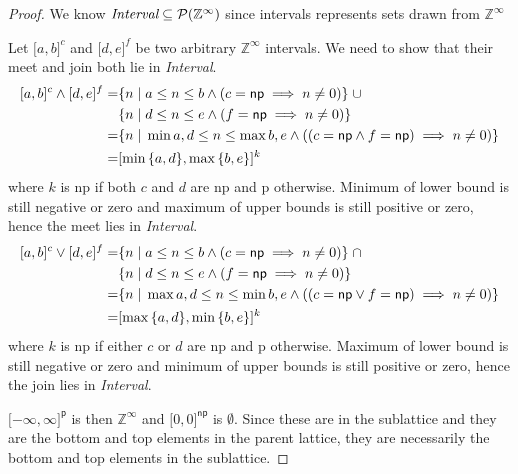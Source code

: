 \documentclass{article}
\theoremstyle{definition}
\theoremstyle{plain}
\newcommand{\zinf}{\textnormal{$\mathbb{Z}^\infty$}}
\newcommand{\interv}[3]{\textnormal{$\lbrack#1,#2\rbrack^{#3}$}}
\begin{document}
\begin{proof}
  We know $\textit{Interval} \subseteq \mathcal{P}(\zinf{})$ since intervals
  represents sets drawn from {\zinf{}}

  Let \interv{a}{b}{c} and \interv{d}{e}{f} be two arbitrary \zinf{} intervals.
  We need to show that their meet and join both lie in \textit{Interval}.
%
  \begin{align*}
    \interv{a}{b}{c} \wedge \interv{d}{e}{f} = &
      \{ n \;|\; a \leq n \leq b \wedge (c = \textsf{np} \implies n \neq 0) \}
      \;\cup \\
      & \{ n \;|\; d \leq n \leq e \wedge (f = \textsf{np} \implies n \neq 0) \}
      \\
    = & \{ n \;|\; \min{a,d} \leq n \leq \max{b,e} \wedge ((c =
      \textsf{np} \wedge f = \textsf{np}) \implies n \neq 0) \} \\
    = & \interv{\min{\{a,d\}}}{\max{\{b,e\}}}{k}
  \end{align*}
%
  where $k$ is \textsf{np} if both $c$ and $d$ are \textsf{np} and \textsf{p}
  otherwise. Minimum of lower bound is still negative or zero and maximum of
  upper bounds is still positive or zero, hence the meet lies in
  \textit{Interval}.
%
  \begin{align*}
    \interv{a}{b}{c} \vee \interv{d}{e}{f} = &
      \{ n \;|\; a \leq n \leq b \wedge (c = \textsf{np} \implies n \neq 0) \}
      \;\cap \\
      & \{ n \;|\; d \leq n \leq e \wedge (f = \textsf{np} \implies n \neq 0) \}
      \\
    = & \{ n \;|\; \max{a,d} \leq n \leq \min{b,e} \wedge ((c =
      \textsf{np} \vee f = \textsf{np}) \implies n \neq 0) \} \\
    = & \interv{\max{\{a,d\}}}{\min{\{b,e\}}}{k}
  \end{align*}
%
  where $k$ is \textsf{np} if either $c$ or $d$ are \textsf{np} and \textsf{p}
  otherwise. Maximum of lower bound is still negative or zero and minimum of
  upper bounds is still positive or zero, hence the join lies in
  \textit{Interval}.

  \interv{-\infty}{\infty}{\textsf{p}} is then \zinf{} and
  \interv{0}{0}{\textsf{np}} is $\emptyset$. Since these are in the sublattice
  and they are the bottom and top elements in the parent lattice, they are
  necessarily the bottom and top elements in the sublattice.
\end{proof}
\end{document}
